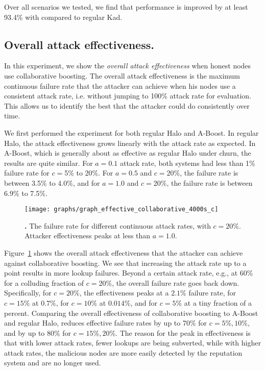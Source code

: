 Over all scenarios we tested, we find that performance is improved by at
least 93.4\% with \ksys compared to regular Kad.





\subsection{Overall attack effectiveness.}
\label{sec:overall_effectiveness}
In this experiment, we show the \emph{overall attack effectiveness} when
honest nodes use 
collaborative boosting. The overall attack effectiveness is the maximum
continuous failure rate that the attacker can achieve when his nodes use
a consistent attack rate, i.e. without jumping to 100\% attack rate for
evaluation. This allows us to identify the best that the attacker could
do consistently over time.


 We first performed the experiment for both regular
Halo and A-Boost. In regular Halo, the attack effectiveness grows
linearly with the attack rate as expected. In A-Boost, which is
generally about as effective as regular Halo under churn, the results
are quite similar. For $a=0.1$ attack rate, both systems had less than
1\% failure rate for $c=$5\% to 20\%. For $a=0.5$ and $c=$20\%, the
failure rate is between 3.5\% to 4.0\%, and for $a=1.0$ and $c=$20\%,
the failure rate is between 6.9\% to 7.5\%.

\begin{figure}[t!]
  \centering 
\texttt{[image: graphs/graph\_effective\_collaborative\_4000s\_c]}
  \caption{{\bf \hsys.} The failure rate for different continuous attack
    rates, with $c=20\%$. Attacker effectiveness peaks at less than
    $a=1.0$.}
  \label{fig:overall_collaborative} 
\end{figure}



Figure~\ref{fig:overall_collaborative} shows the overall attack
effectiveness that the attacker can achieve against collaborative
boosting. We see that increasing the attack rate up to a point results
in more lookup failures. Beyond a certain attack rate, e.g., at 60\% for
a colluding fraction of $c=20\%$, the overall failure rate goes back
down. Specifically, for $c=20\%$, the effectiveness peaks at a $2.1\%$
failure rate, for $c=15\%$ at $0.7\%$, for $c = 10\%$ at $0.014\%$, and
for $c = 5\%$ at a tiny fraction of a percent. Comparing the overall
effectiveness of collaborative boosting to A-Boost and regular Halo,
\sys reduces effective failure rates by up to 70\% for $c = 5\%, 10\%$,
and by up to 80\% for $c = 15\%, 20\%$.
The reason for the peak in effectiveness is that with lower attack
rates, fewer lookups are being subverted, while with higher attack
rates, the malicious nodes are more easily detected by the reputation
system and are no longer used.

